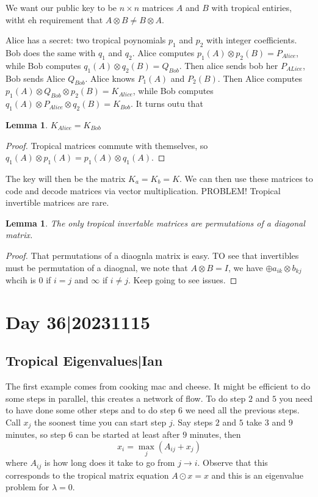 \documentclass[12pt]{memoir}
\newtheorem{protolemma}[prototheorem]{Lemma}
\newenvironment{lemma}
   {\begin{protolemma}}
   {\end{protolemma}}
\theoremstyle{definition}
\def\la{\lambda}
\begin{document}
We want our public key to be $n \times n$ matrices $A$ and $B$ with tropical entiries, witht eh requirement that $A \otimes B \neq B \otimes A$.


Alice has a secret: two tropical poynomials $p_1$ and $p_2$ with integer coefficients. Bob  does the same with $q_1$ and $q_2$. Alice computes $p_1(A) \otimes p_2(B)=P_{Alice}$, while Bob computes $q_1(A)\otimes q_2(B)=Q_{Bob}$. Then alice sends bob her $P_{ALice}$, Bob sends Alice $Q_{Bob}$. Alice knows $P_1(A)$ and $P_2(B)$. Then Alice computes $p_1(A) \otimes Q_{Bob}\otimes p_2(B)=K_{Alice}$, while Bob computes $q_1(A) \otimes P_{Alice} \otimes q_2(B)=K_{Bob}$. It turns outu that 

\begin{lemma}
    $K_{Alice}=K_{Bob}$
\end{lemma}

\begin{proof}
    Tropical matrices commute with themselves, so $q_1(A)\otimes p_1(A)= p_1(A) \otimes q_1(A)$.
\end{proof}



The key will then be the matrix $K_a=K_b=K$. We can then use these matrices to code and decode matrices via vector multiplication. PROBLEM! Tropical invertible matrices are rare.

\begin{lemma}
    The only tropical invertable matrices are permutations of a diagonal matrix.
\end{lemma}

\begin{proof}
    That permutations of a diaognla matrix is easy. TO see that invertibles must be permutation of a diaognal, we note that $A \otimes B = I$, we have $\oplus a_{ik} \otimes b_{kj}$ whcih is $0$ if $i =j$ and $\infty$ if $i \neq j$. Keep going to see issues.
\end{proof}





\section{Day 36|20231115}

\subsection{Tropical Eigenvalues|Ian}

\begin{Ex}
    The first example comes from cooking mac and cheese. It might be efficient to do some steps in parallel, this creates a network of flow. To do step $2$ and $5$ you need to have done some other steps and to do step $6$ we need all the previous steps. Call $x_j$ the soonest time you can start step $j$. Say steps $2$ and $5$ take $3$ and $9$ minutes, so step $6$ can be started at least after $9$ minutes, then 
    $$x_i=\max_j(A_{ij}+x_j)$$
    where $A_{ij}$ is how long does it take to go from $j\to i$. Observe that this corresponds to the tropical matrix equation $A\odot x=x$ and this is an eigenvalue problem for $\la=0$.
\end{Ex}
\end{document}
